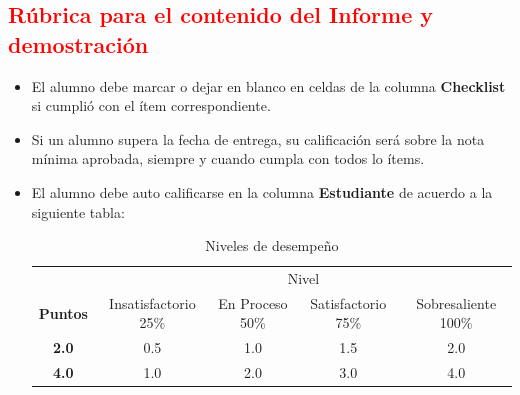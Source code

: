 \documentclass{article}
\begin{document}
	\subsection{\textcolor{red}{Rúbrica para el contenido del Informe y demostración}}
	\begin{itemize}			
		\item El alumno debe marcar o dejar en blanco en celdas de la columna \textbf{Checklist} si cumplió con el ítem correspondiente.
		\item Si un alumno supera la fecha de entrega,  su calificación será sobre la nota mínima aprobada, siempre y cuando cumpla con todos lo ítems.
		\item El alumno debe auto calificarse en la columna \textbf{Estudiante} de acuerdo a la siguiente tabla:
	
		\begin{table}[ht]
			\caption{Niveles de desempeño}
			\begin{center}
			\begin{tabular}{ccccc}
    			\hline
    			 & \multicolumn{4}{c}{Nivel}\\
    			\cline{1-5}
    			\textbf{Puntos} & Insatisfactorio 25\%& En Proceso 50\% & Satisfactorio 75\% & Sobresaliente 100\%\\
    			\textbf{2.0}&0.5&1.0&1.5&2.0\\
    			\textbf{4.0}&1.0&2.0&3.0&4.0\\
    		\hline
			\end{tabular}
		\end{center}
	\end{table}	
	
	\end{itemize}
	
\end{document}
